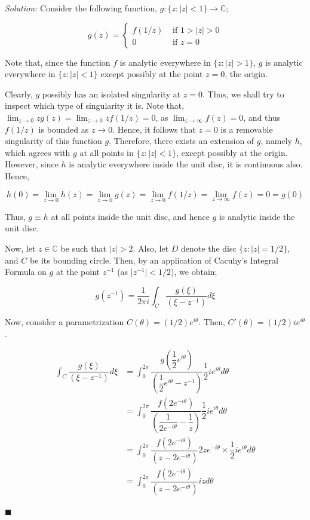 \documentclass[12pt]{article}
\newcommand{\C}{\mathbb{C}}
\theoremstyle{definition}
\newenvironment{answer}{\textit{Solution: }\quad }{ \hfill $\blacksquare$}
\numberwithin{equation}{section}
\begin{document}
\begin{answer}
	Consider the following function, $g : \{ z : \vert z \vert < 1 \} \rightarrow \C$;

	$$
	g(z) = \begin{cases}
		f(1/z) & \text{ if } 1 > \vert z \vert > 0\\
		0 & \text{ if } z = 0
	\end{cases}
	$$

	Note that, since the function $f$ is analytic everywhere in $\{ z : \vert z \vert > 1 \}$, $g$ is analytic everywhere in $\{ z : \vert z \vert < 1\}$ except possibly at the point $z = 0$, the origin.

	Clearly, $g$ possibly has an isolated singularity at $z = 0$. Thus, we shall try to inspect which type of singularity it is. Note that, $\lim_{z \rightarrow 0} z g(z) = \lim_{z \rightarrow 0} z f(1/z) = 0$, as $\lim_{z \rightarrow \infty} f(z) = 0$, and thus $f(1/z)$ is bounded as $z \rightarrow 0$. Hence, it follows that $z = 0$ is a removable singularity of this function $g$. Therefore, there exists an extension of $g$, namely $h$, which agrees with $g$ at all points in $\{ z : \vert z \vert < 1\}$, except possibly at the origin. However, since $h$ is analytic everywhere inside the unit disc, it is continuous also. Hence,

	$$
	h(0) = \lim_{z \rightarrow 0}h(z) = \lim_{z \rightarrow 0}g(z) = \lim_{z \rightarrow 0} f(1/z) = \lim_{z \rightarrow \infty} f(z) = 0 = g(0)
	$$

	Thus, $g \equiv h$ at all points inside the unit disc, and hence $g$ is analytic inside the unit disc.

	Now, let $z\in \C$ be such that $\vert z \vert > 2$. Also, let $D$ denote the disc $\{ z : \vert z \vert = 1/2\}$, and $C$ be its bounding circle. Then, by an application of Cacuhy's Integral Formula on $g$ at the point $z^{-1}$ (as $\vert z^{-1} \vert < 1/2$), we obtain;

	\begin{equation}
		g(z^{-1}) = \dfrac{1}{2\pi i} \int_{C} \dfrac{g(\xi)}{(\xi - z^{-1})}d\xi
		\label{eqn:5-1}		
	\end{equation}

	Now, consider a parametrization $C(\theta) = (1/2)e^{i\theta}$. Then, $C'(\theta) = (1/2)i e^{i\theta}$.

	\begin{align*}
		\int_{C} \dfrac{g(\xi)}{(\xi - z^{-1})}d\xi
		& = \int_{0}^{2\pi} \dfrac{g\left( \dfrac{1}{2}e^{i\theta} \right)}{\left( \dfrac{1}{2}e^{i\theta} - z^{-1} \right)} \dfrac{1}{2} i e^{i\theta} d\theta\\
		& = \int_{0}^{2\pi} \dfrac{f\left( 2e^{-i\theta} \right)}{\left( \dfrac{1}{2e^{-i\theta}} - \dfrac{1}{z} \right)} \dfrac{1}{2} i e^{i\theta} d\theta\\
		& = \int_{0}^{2\pi} \dfrac{f\left( 2e^{-i\theta} \right)}{(z - 2e^{-i\theta})} 2ze^{-i\theta} \times \dfrac{1}{2} i e^{i\theta} d\theta\\
		& = \int_{0}^{2\pi} \dfrac{f\left( 2e^{-i\theta} \right)}{(z - 2e^{-i\theta})} iz d\theta
	\end{align*}


\end{answer}
\end{document}
